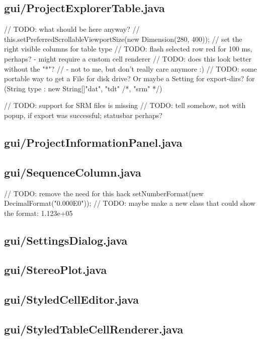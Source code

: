 \subsection{gui/ProjectExplorerTable.java}
        // TODO: what should be here anyway?
        // this.setPreferredScrollableViewportSize(new Dimension(280, 400));
        // set the right visible columns for table type
                    // TODO: flash selected row red for 100 ms, perhaps? - might require a custom cell renderer
            // TODO: does this look better without the "*"?
            // - not to me, but don't really care anymore :)
            // TODO: some portable way to get a File for disk drive? Or maybe a Setting for export-dirs?
                for (String type : new String[]{"dat", "tdt" /*, "srm" */}) {   // TODO: support for SRM files is missing
                                // TODO: tell somehow, not with popup, if export was successful; statusbar perhaps?

\subsection{gui/ProjectInformationPanel.java}

\subsection{gui/SequenceColumn.java}
        // TODO: remove the need for this hack
            setNumberFormat(new DecimalFormat("0.000E0"));  // TODO: maybe make a new class that could show the format: 1.123e+05

\subsection{gui/SettingsDialog.java}

\subsection{gui/StereoPlot.java}

\subsection{gui/StyledCellEditor.java}

\subsection{gui/StyledTableCellRenderer.java}

}
